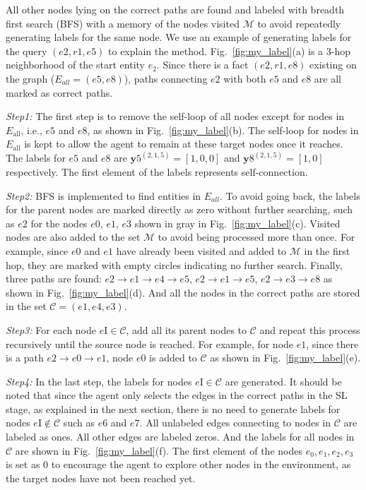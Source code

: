 \documentclass[lettersize,journal]{IEEEtran}
\begin{document}
All other nodes lying on the correct paths are found and labeled with breadth first search (BFS) with a memory of the nodes visited $\mathcal{M}$ to avoid repeatedly generating labels for the same node. We use an example of generating labels for the query $(e2,r1,e5)$ to explain the method.  
Fig.~\ref{fig:my_label}(a) is a 3-hop neighborhood of the start entity $e_2$. Since there is a fact $(e2,r1,e8)$ existing on the graph ($E_{all}=(e5,e8)$), paths connecting $e2$ with both $e5$ and $e8$ are all marked as correct paths.


\textit{Step1:} The first step is to remove the self-loop of all nodes except for nodes in $E_{\mathrm{all}}$, i.e., $e5$ and $e8$, as shown in Fig.~\ref{fig:my_label}(b). The self-loop for nodes in $E_{\mathrm{all}}$ is kept to allow the agent to remain at these target nodes once it reaches. The labels for $e5$ and $e8$ are $\mathbf{y}5^{(2,1,5)}=[1,0,0]$ and $\mathbf{y}8^{(2,1,5)}=[1,0]$ respectively. The first element of the labels represents self-connection.  

\textit{Step2:} BFS is implemented to find entities in $E_{all}$. To avoid going back, the labels for the parent nodes are marked directly as zero without further searching, such as $e2$ for the nodes $e0$, $e1$, $e3$ shown in gray in Fig.~\ref{fig:my_label}(c). Visited nodes are also added to the set $\mathcal{M}$ to avoid being processed more than once. For example, since $e0$ and $e1$ have already been visited and added to $\mathcal{M}$ in the first hop, they are marked with empty circles indicating no further search. Finally, three paths are found: $e2\rightarrow e1\rightarrow e4 \rightarrow e5$, $e2 \rightarrow e1 \rightarrow e5$, $e2\rightarrow e3\rightarrow e8$ as shown in Fig.~\ref{fig:my_label}(d). And all the nodes in the correct paths are stored in the set $\mathcal{C}=(e1,e4,e3)$. 

\textit{Step3:}  For each node $e\mathrm{I} \in \mathcal{C}$, add all its parent nodes to $\mathcal{C}$ and repeat this process recursively until the source node is reached. For example, for node $e1$, since there is a path $e2\rightarrow e0\rightarrow e1$, node $e0$ is added to $\mathcal{C}$ as shown in Fig.~\ref{fig:my_label}(e).

\textit{Step4:} In the last step, the labels for nodes $e\mathrm{I} \in \mathcal{C}$ are generated. It should be noted that since the agent only selects the edges in the correct paths in the SL stage, as explained in the next section, there is no need to generate labels for nodes $e\mathrm{I} \notin \mathcal{C}$ such as $e6$ and $e7$. All unlabeled edges connecting to nodes in $\mathcal{C}$ are labeled as ones. All other edges are labeled zeros. And the labels for all nodes in $\mathcal{C}$ are shown in Fig.~\ref{fig:my_label}(f). The first element of the nodes $e_0,e_1,e_2,e_3$ is set as 0 to encourage the agent to explore other nodes in the environment, as the target nodes have not been reached yet. 
\end{document}
